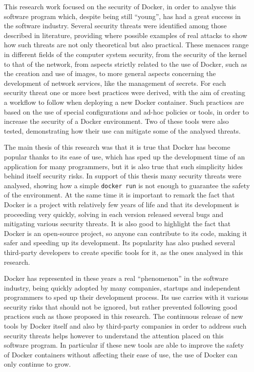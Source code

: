 \documentclass[a4paper,12pt]{article}
\newcommand{\code}[1]{\lstinline|#1|}
\begin{document}
This research work focused on the security of Docker, in order to analyse this
software program which, despite being still ``young'', has had a great success
in the software industry. Several security threats were identified among those
described in literature, providing where possible examples of real attacks to
show how such threats are not only theoretical but also practical. These menaces
range in different fields of the computer system security, from the security of
the kernel to that of the network, from aspects strictly related to the use of
Docker, such as the creation and use of images, to more general aspects
concerning the development of network services, like the management of secrets.
For each security threat one or more best practices were derived, with the aim
of creating a workflow to follow when deploying a new Docker container. Such
practices are based on the use of special configurations and ad-hoc policies or
tools, in order to increase the security of a Docker environment. Two of these
tools were also tested, demonstrating how their use can mitigate some of the
analysed threats. \par The main thesis of this research was that it is true that
Docker has become popular thanks to its ease of use, which has sped up the
development time of an application for many programmers, but it is also true
that such simplicity hides behind itself security risks. In support of this
thesis many security threats were analysed, showing how a simple \code{docker
run} is not enough to guarantee the safety of the environment. At the same time
it is important to remark the fact that Docker is a project with relatively few
years of life and that its development is proceeding very quickly, solving in
each version released several bugs and mitigating various security threats. It
is also good to highlight the fact that Docker is an open-source project, so
anyone can contribute to its code, making it safer and speeding up its
development. Its popularity has also pushed several third-party developers to
create specific tools for it, as the ones analysed in this research. \par Docker
has represented in these years a real ``phenomenon'' in the software industry,
being quickly adopted by many companies, startups and independent programmers to
sped up their development process. Its use carries with it various security
risks that should not be ignored, but rather prevented following good practices
such as those proposed in this research. The continuous release of new tools by
Docker itself and also by third-party companies in order to address such
security threats helps however to understand the attention placed on this
software program. In particular if these new tools are able to improve the
safety of Docker containers without affecting their ease of use, the use of
Docker can only continue to grow.
\end{document}
